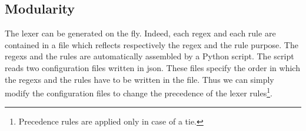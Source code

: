 \subsection{Modularity}
The lexer can be generated on the fly. Indeed, each regex and each rule are
contained in a file which reflects respectively the regex and the rule purpose.
The regexs and the rules are automatically assembled by a Python script.
The script reads two configuration files written in json. These files specify
the order in which the regexs and the rules have to be written in the
 file. Thus we can simply modify the configuration files to 
change the precedence of the lexer rules\footnote{Precedence rules are 
applied only in case of a tie.}.
